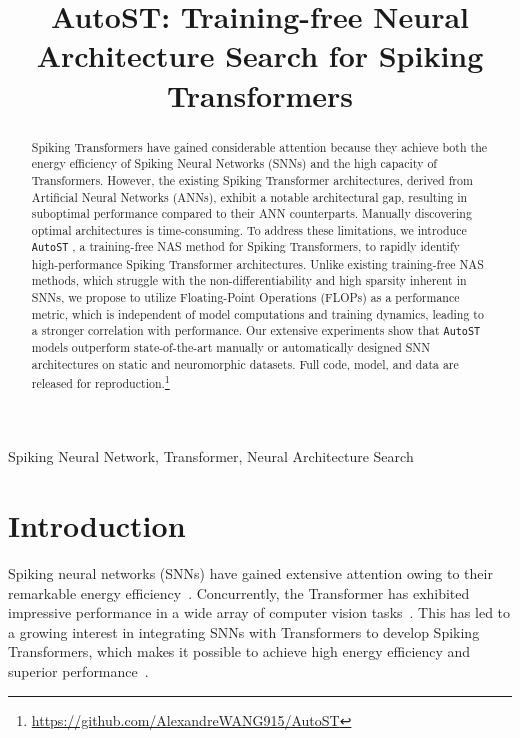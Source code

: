 \documentclass{article}
\title{AutoST: Training-free Neural Architecture Search for Spiking Transformers}
\theoremstyle{plain}
\theoremstyle{definition}
\theoremstyle{remark}
\begin{document}
\ninept
\newcommand{\sysname}{\texttt{AutoST} }
\newcommand{\sysnameOnlyAuto}{{\footnotesize{ \texttt{AutoST}}}}
\newcommand{\cmark}{\ding{51}}%
\newcommand{\xmark}{\ding{55}}%
%
\maketitle
%
\begin{abstract}
Spiking Transformers have gained considerable attention because they achieve both the energy efficiency of Spiking Neural Networks (SNNs) and the high capacity of Transformers. However, the existing Spiking Transformer architectures, derived from Artificial Neural Networks (ANNs), exhibit a notable architectural gap, resulting in suboptimal performance compared to their ANN counterparts. Manually discovering optimal architectures is time-consuming. To address these limitations, we introduce \sysname, a training-free NAS method for Spiking Transformers, to rapidly identify high-performance Spiking Transformer architectures. Unlike existing training-free NAS methods, which struggle with the non-differentiability and high sparsity inherent in SNNs, we propose to utilize Floating-Point Operations (FLOPs) as a performance metric, which is independent of model computations and training dynamics, leading to a stronger correlation with performance. Our extensive experiments show that \sysname models outperform state-of-the-art manually or automatically designed SNN architectures on static and neuromorphic datasets. Full code, model, and data are released for reproduction.\footnote{\url{https://github.com/AlexandreWANG915/AutoST}}
\end{abstract}
%
\begin{keywords}
Spiking Neural Network, Transformer, Neural Architecture Search
\end{keywords}
%
\section{Introduction}
\label{sec:intro}

Spiking neural networks (SNNs) have gained extensive attention owing to their remarkable energy efficiency~\cite{maassNetworksSpikingNeurons1997}. Concurrently, the Transformer has exhibited impressive performance in a wide array of computer vision tasks~\cite{dosovitskiyImageWorth16x162020, liuSwinTransformerHierarchical2021}. This has led to a growing interest in integrating SNNs with Transformers to develop Spiking Transformers, which makes it possible to achieve high energy efficiency and superior performance~\cite{zhouSpikformerWhenSpiking2022, wang_efficient_2022}.
\end{document}
